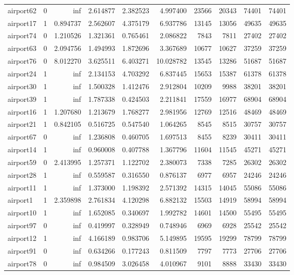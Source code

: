 \begin{longtable}{|l|r|r|r|r|r|r|r|r|r|}
airport62 & 0 & inf & 2.614877 & 2.382523 & 4.997400 & 23566 & 20343 & 74401 & 74401 \\
airport17 & 1 & 0.894737 & 2.562607 & 4.375179 & 6.937786 & 13145 & 13056 & 49635 & 49635 \\
airport74 & 0 & 1.210526 & 1.321361 & 0.765461 & 2.086822 & 7843 & 7811 & 27402 & 27402 \\
airport63 & 0 & 2.094756 & 1.494993 & 1.872696 & 3.367689 & 10677 & 10627 & 37259 & 37259 \\
airport76 & 0 & 8.012270 & 3.625511 & 6.403271 & 10.028782 & 13545 & 13286 & 51687 & 51687 \\
airport24 & 1 & inf & 2.134153 & 4.703292 & 6.837445 & 15653 & 15387 & 61378 & 61378 \\
airport30 & 1 & inf & 1.500328 & 1.412476 & 2.912804 & 10209 & 9988 & 38201 & 38201 \\
airport39 & 1 & inf & 1.787338 & 0.424503 & 2.211841 & 17559 & 16977 & 68904 & 68904 \\
airport16 & 1 & 1.207680 & 1.213679 & 1.768277 & 2.981956 & 12769 & 12516 & 48469 & 48469 \\
airport21 & 1 & 0.842105 & 0.516725 & 0.547540 & 1.064265 & 8545 & 8515 & 30757 & 30757 \\
airport67 & 0 & inf & 1.236808 & 0.460705 & 1.697513 & 8455 & 8239 & 30411 & 30411 \\
airport14 & 1 & inf & 0.960008 & 0.407788 & 1.367796 & 11604 & 11545 & 45271 & 45271 \\
airport59 & 0 & 2.413995 & 1.257371 & 1.122702 & 2.380073 & 7338 & 7285 & 26302 & 26302 \\
airport28 & 1 & inf & 0.559587 & 0.316550 & 0.876137 & 6977 & 6957 & 24246 & 24246 \\
airport11 & 1 & inf & 1.373000 & 1.198392 & 2.571392 & 14315 & 14045 & 55086 & 55086 \\
airport1 & 1 & 2.359898 & 2.761834 & 4.120298 & 6.882132 & 15503 & 14919 & 58994 & 58994 \\
airport10 & 1 & inf & 1.652085 & 0.340697 & 1.992782 & 14601 & 14500 & 55495 & 55495 \\
airport97 & 0 & inf & 0.419997 & 0.328949 & 0.748946 & 6969 & 6928 & 25542 & 25542 \\
airport12 & 1 & inf & 4.166189 & 0.983706 & 5.149895 & 19595 & 19299 & 78799 & 78799 \\
airport91 & 0 & inf & 0.634266 & 0.177243 & 0.811509 & 7797 & 7773 & 27706 & 27706 \\
airport78 & 0 & inf & 0.984509 & 3.026458 & 4.010967 & 9101 & 8888 & 33430 & 33430 \\

\end{longtable}
